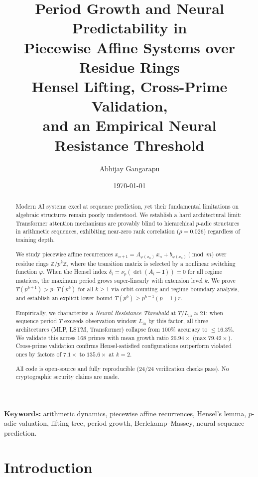 \documentclass[11pt]{article}
\title{%
  \LARGE\textbf{Period Growth and Neural Predictability in\\
  Piecewise Affine Systems over Residue Rings}\\[7pt]
  \large Hensel Lifting, Cross-Prime Validation,\\
  and an Empirical Neural Resistance Threshold
}
\author{Abhijay Gangarapu}
\affil{\normalsize McNeil High School, Austin, Texas $\cdot$ Class of 2030\\[-2pt]
\small\url{https://github.com/CoderAwesomeAbhi/neural-cryptanalysis}}
\date{\today}
\theoremstyle{plain}
\theoremstyle{definition}
\newcommand{\Z}{\mathbb{Z}}
\newcommand{\vp}{\nu_p}
\newcommand{\Id}{\mathbf{I}}
\begin{document}
\maketitle
\thispagestyle{empty}

\begin{abstract}
Modern AI systems excel at sequence prediction, yet their fundamental limitations on algebraic structures remain poorly understood. We establish a hard architectural limit: Transformer attention mechanisms are provably blind to hierarchical $p$-adic structures in arithmetic sequences, exhibiting near-zero rank correlation ($\rho = 0.026$) regardless of training depth.

We study piecewise affine recurrences $x_{n+1} = A_{\varphi(x_n)}\,x_n + b_{\varphi(x_n)} \pmod{m}$ over residue rings $\Z/p^k\Z$, where the transition matrix is selected by a nonlinear switching function $\varphi$. When the Hensel index $\delta_i = \vp(\det(A_i - \Id)) = 0$ for all regime matrices, the maximum period grows super-linearly with extension level $k$. We prove $T(p^{k+1}) > p \cdot T(p^k)$ for all $k \geq 1$ via orbit counting and regime boundary analysis, and establish an explicit lower bound $T(p^k) \geq p^{k-1}(p-1)r$.

Empirically, we characterize a \emph{Neural Resistance Threshold} at $T/L_{\mathrm{in}} \approx 21$: when sequence period $T$ exceeds observation window $L_{\mathrm{in}}$ by this factor, all three architectures (MLP, LSTM, Transformer) collapse from $100\%$ accuracy to $\leq 16.3\%$. We validate this across 168 primes with mean growth ratio $26.94\times$ (max $79.42\times$). Cross-prime validation confirms Hensel-satisfied configurations outperform violated ones by factors of $7.1\times$ to $135.6\times$ at $k=2$.

All code is open-source and fully reproducible (24/24 verification checks pass). No cryptographic security claims are made.
\end{abstract}

\vspace{4pt}
\noindent\textbf{Keywords:} arithmetic dynamics, piecewise affine recurrences, Hensel's lemma, $p$-adic valuation, lifting tree, period growth, Berlekamp--Massey, neural sequence prediction.

\newpage\tableofcontents\newpage

\section{Introduction}
\label{sec:intro}
\end{document}
